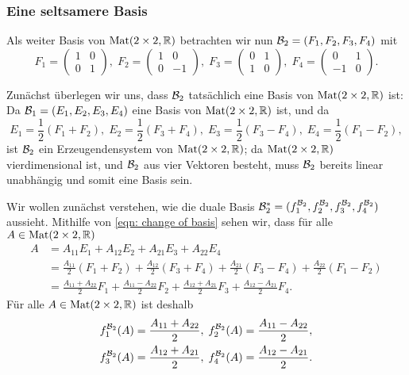 \documentclass[a4paper,10pt]{article}
\begin{document}
\subsubsection{Eine seltsamere Basis}
Als weiter Basis von $\mathrm{Mat}(2 \times 2, \mathbb{R})$ betrachten wir nun $\mathcal{B}_2 = (F_1, F_2, F_3, F_4)$ mit
\[
 F_1 = \begin{pmatrix} 1 & 0 \\  0 &  1 \end{pmatrix}, \;
 F_2 = \begin{pmatrix} 1 & 0 \\  0 & -1 \end{pmatrix}, \;
 F_3 = \begin{pmatrix} 0 & 1 \\  1 &  0 \end{pmatrix}, \;
 F_4 = \begin{pmatrix} 0 & 1 \\ -1 &  0 \end{pmatrix}.
\]

Zunächst überlegen wir uns, dass $\mathcal{B}_2$ tatsächlich eine Basis von $\mathrm{Mat}(2 \times 2, \mathbb{R})$ ist: Da $\mathcal{B}_1 = (E_1, E_2, E_3, E_4)$ eine Basis von $\mathrm{Mat}(2 \times 2, \mathbb{R})$ ist, und da
\begin{equation}\label{eqn: change of basis}
 E_1 = \frac{1}{2}(F_1+F_2), \;
 E_2 = \frac{1}{2}(F_3+F_4), \;
 E_3 = \frac{1}{2}(F_3-F_4), \;
 E_4 = \frac{1}{2}(F_1-F_2),
\end{equation}
ist $\mathcal{B}_2$ ein Erzeugendensystem von $\mathrm{Mat}(2 \times 2, \mathbb{R})$; da $\mathrm{Mat}(2 \times 2, \mathbb{R})$ vierdimensional ist, und $\mathcal{B}_2$ aus vier Vektoren besteht, muss $\mathcal{B}_2$ bereits linear unabhängig und somit eine Basis sein.

Wir wollen zunächst verstehen, wie die duale Basis $\mathcal{B}_2^* = (f^{\mathcal{B}_2}_1, f^{\mathcal{B}_2}_2, f^{\mathcal{B}_2}_3, f^{\mathcal{B}_2}_4)$ aussieht. Mithilfe von \eqref{eqn: change of basis} sehen wir, dass für alle $A \in \mathrm{Mat}(2 \times 2, \mathbb{R})$
\begin{align*}
 A
 &= A_{11} E_1 + A_{12} E_2 + A_{21} E_3 + A_{22} E_4 \\
 &= \frac{A_{11}}{2} (F_1 + F_2) + \frac{A_{12}}{2} (F_3 + F_4)
   + \frac{A_{21}}{2} (F_3 - F_4) + \frac{A_{22}}{2} (F_1 - F_2) \\
 &= \frac{A_{11}+A_{22}}{2} F_1 + \frac{A_{11}-A_{22}}{2} F_2 + \frac{A_{12}+A_{21}}{2} F_3 + \frac{A_{12}-A_{21}}{2} F_4.
\end{align*}
Für alle $A \in \mathrm{Mat}(2 \times 2, \mathbb{R})$ ist deshalb
\begin{gather*}
 f^{\mathcal{B}_2}_1(A) = \frac{A_{11}+A_{22}}{2}, \;
 f^{\mathcal{B}_2}_2(A) = \frac{A_{11}-A_{22}}{2}, \\
 f^{\mathcal{B}_2}_3(A) = \frac{A_{12}+A_{21}}{2}, \;
 f^{\mathcal{B}_2}_4(A) = \frac{A_{12}-A_{21}}{2}.
\end{gather*}
\end{document}
